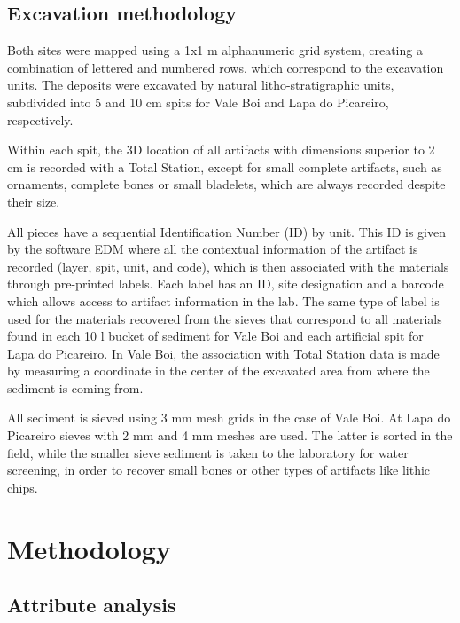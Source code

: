 \documentclass[12pt,twoside]{reedthesis}
\begin{document}
\hypertarget{excavation-methodology}{%
\section{Excavation methodology}\label{excavation-methodology}}

Both sites were mapped using a 1x1 m alphanumeric grid system, creating a combination of lettered and numbered rows, which correspond to the excavation units. The deposits were excavated by natural litho-stratigraphic units, subdivided into 5 and 10 cm spits for Vale Boi and Lapa do Picareiro, respectively.

Within each spit, the 3D location of all artifacts with dimensions superior to 2 cm is recorded with a Total Station, except for small complete artifacts, such as ornaments, complete bones or small bladelets, which are always recorded despite their size.

All pieces have a sequential Identification Number (ID) by unit. This ID is given by the software EDM where all the contextual information of the artifact is recorded (layer, spit, unit, and code), which is then associated with the materials through pre-printed labels. Each label has an ID, site designation and a barcode which allows access to artifact information in the lab. The same type of label is used for the materials recovered from the sieves that correspond to all materials found in each 10 l bucket of sediment for Vale Boi and each artificial spit for Lapa do Picareiro. In Vale Boi, the association with Total Station data is made by measuring a coordinate in the center of the excavated area from where the sediment is coming from.

All sediment is sieved using 3 mm mesh grids in the case of Vale Boi. At Lapa do Picareiro sieves with 2 mm and 4 mm meshes are used. The latter is sorted in the field, while the smaller sieve sediment is taken to the laboratory for water screening, in order to recover small bones or other types of artifacts like lithic chips.

\hypertarget{methodology}{%
\chapter{Methodology}\label{methodology}}

\hypertarget{attribute-analysis}{%
\section{Attribute analysis}\label{attribute-analysis}}
\end{document}
